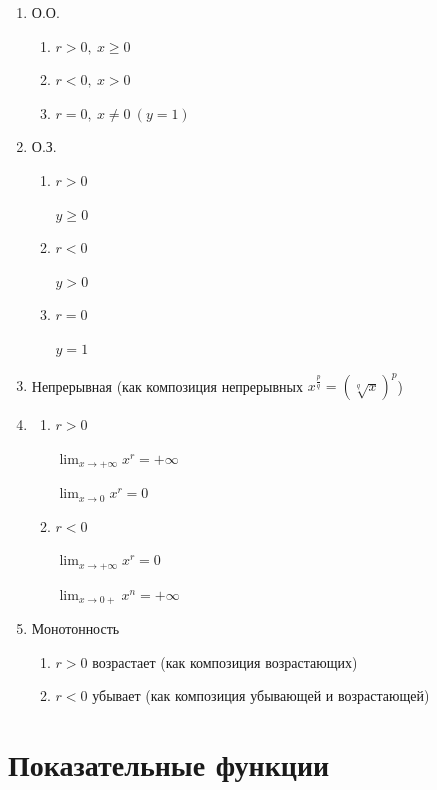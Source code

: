 \documentclass{article}
\begin{document}
    \begin{enumerate}
        \item О.О.
        \begin{enumerate}
            \item \( r > 0,\ x \geq 0\)
            \item \( r < 0,\ x > 0\)
            \item \( r = 0,\ x \neq 0\ (y = 1)\)
        \end{enumerate}
        \item О.З.
        \begin{enumerate}
            \item \( r > 0 \)
                        
            \( y \geq 0 \)
            \item \( r < 0 \)
            
            \( y > 0 \)
            \item \(r = 0\)

            \(y = 1\)
        \end{enumerate}
        \item Непрерывная (как композиция непрерывных \( x^{\frac{p}{q}} = (\sqrt[q]{x})^p \))
        \item 
        \begin{enumerate}
            \item \(r > 0\)
            
            \(\lim_{x \rightarrow +\infty} x^r = +\infty\)
        
            \(\lim_{x \rightarrow 0} x^r = 0\)

            \item \(r < 0\)
            
            \(\lim_{x \rightarrow +\infty} x^r = 0\)

            \(\lim_{x \rightarrow 0+} x^n = +\infty\)
        \end{enumerate}
        \item Монотонность
        \begin{enumerate}
            \item \( r > 0 \) возрастает (как композиция возрастающих)
            \item \( r < 0 \) убывает (как композиция убывающей и возрастающей) 
        \end{enumerate}
    \end{enumerate}
    
    \section{Показательные функции}
\end{document}
